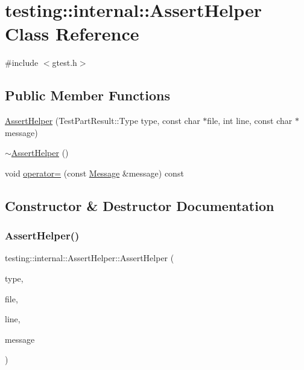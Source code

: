 \hypertarget{classtesting_1_1internal_1_1AssertHelper}{}\section{testing\+::internal\+::Assert\+Helper Class Reference}
\label{classtesting_1_1internal_1_1AssertHelper}


{\ttfamily \#include $<$gtest.\+h$>$}

\subsection*{Public Member Functions}
\begin{DoxyCompactItemize}
\item 
\mbox{\hyperlink{classtesting_1_1internal_1_1AssertHelper_ac2c9334518fd4087189b4505567a3c90}{Assert\+Helper}} (Test\+Part\+Result\+::\+Type type, const char $\ast$file, int line, const char $\ast$message)
\item 
\mbox{\hyperlink{classtesting_1_1internal_1_1AssertHelper_a51c640785d4ed4a0155cc9aa857d8931}{$\sim$\+Assert\+Helper}} ()
\item 
void \mbox{\hyperlink{classtesting_1_1internal_1_1AssertHelper_a97bf22d786131ab7baa86b97a27aeb4d}{operator=}} (const \mbox{\hyperlink{classtesting_1_1Message}{Message}} \&message) const
\end{DoxyCompactItemize}


\subsection{Constructor \& Destructor Documentation}
\mbox{\label{classtesting_1_1internal_1_1AssertHelper_ac2c9334518fd4087189b4505567a3c90}} 
\subsubsection{\texorpdfstring{AssertHelper()}{AssertHelper()}}
{\footnotesize\ttfamily testing\+::internal\+::\+Assert\+Helper\+::\+Assert\+Helper (\begin{DoxyParamCaption}\item[{Test\+Part\+Result\+::\+Type}]{type,  }\item[{const char $\ast$}]{file,  }\item[{int}]{line,  }\item[{const char $\ast$}]{message }\end{DoxyParamCaption})}

